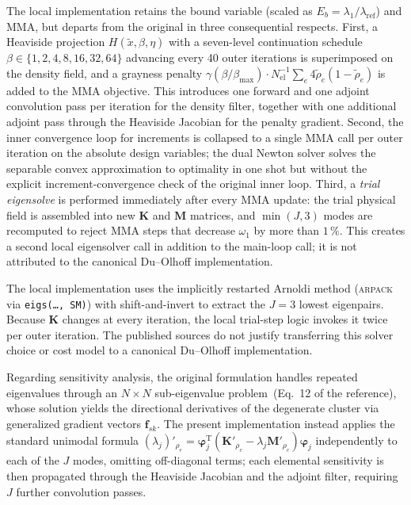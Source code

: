 The local implementation retains the bound variable (scaled as
$E_b = \lambda_1 / \lambda_\mathrm{ref}$) and MMA, but departs from the original
in three consequential respects.  First, a Heaviside projection
$H(\tilde{x},\beta,\eta)$ with a seven-level continuation schedule
$\beta \in \{1,2,4,8,16,32,64\}$ advancing every 40 outer iterations is
superimposed on the density field, and a grayness penalty
$\gamma(\beta/\beta_{\max}) \cdot N_\mathrm{el}^{-1} \sum_e 4\tilde{\rho}_e(1 -
\tilde{\rho}_e)$ is added to the MMA objective.  This introduces one forward and one
adjoint convolution pass per iteration for the density filter, together with one
additional adjoint pass through the Heaviside Jacobian for the penalty gradient.
Second, the inner convergence loop for increments is collapsed to a single MMA call
per outer iteration on the absolute design variables; the dual Newton solver solves
the separable convex approximation to optimality in one shot but without the explicit
increment-convergence check of the original inner loop. Third, a
\emph{trial eigensolve} is performed immediately
after every MMA update: the trial physical field is assembled into new $\mathbf{K}$
and $\mathbf{M}$ matrices, and $\min(J,3)$ modes are recomputed to reject MMA steps
that decrease $\omega_1$ by more than $1\,\%$. This creates a second local
eigensolver call in addition to the main-loop call; it is not attributed to the
canonical Du--Olhoff implementation.

The local implementation uses the implicitly restarted Arnoldi method
(\textsc{arpack} via \texttt{eigs(\ldots,\,\textquotesingle SM\textquotesingle)})
with shift-and-invert to extract the $J = 3$ lowest eigenpairs. Because
$\mathbf{K}$ changes at every iteration, the local trial-step logic invokes it
twice per outer iteration. The published sources do not justify transferring
this solver choice or cost model to a canonical Du--Olhoff implementation.

Regarding sensitivity analysis, the original formulation handles repeated
eigenvalues through an $N\times N$ sub-eigenvalue problem~(Eq.~12 of the reference),
whose solution yields the directional derivatives of the degenerate cluster via
generalized gradient vectors $\mathbf{f}_{sk}$.  The present implementation instead
applies the standard unimodal formula
$(\lambda_j)'_{\rho_e} = \boldsymbol{\varphi}_j^{\mathrm{T}}
 (\mathbf{K}'_{\rho_e} - \lambda_j \mathbf{M}'_{\rho_e})\boldsymbol{\varphi}_j$
independently to each of the $J$ modes, omitting off-diagonal terms; each elemental
sensitivity is then propagated through the Heaviside Jacobian and the adjoint filter,
requiring $J$ further convolution passes.

